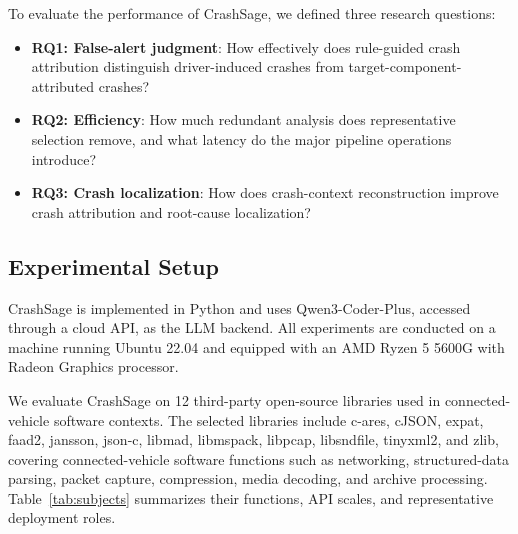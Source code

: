 \documentclass[pdflatex,sn-basic]{sn-jnl}%
\theoremstyle{thmstyleone}%
\theoremstyle{thmstyletwo}%
\theoremstyle{thmstylethree}%
\begin{document}
To evaluate the performance of CrashSage, we defined three research questions:

\begin{itemize}
    \item \textbf{RQ1: False-alert judgment}: How effectively does rule-guided crash attribution distinguish driver-induced crashes from target-component-attributed crashes?
    \item \textbf{RQ2: Efficiency}: How much redundant analysis does representative selection remove, and what latency do the major pipeline operations introduce?
    \item \textbf{RQ3: Crash localization}: How does crash-context reconstruction improve crash attribution and root-cause localization?
\end{itemize}

\subsection{Experimental Setup}

CrashSage is implemented in Python and uses Qwen3-Coder-Plus, accessed through a cloud API, as the LLM backend. All experiments are conducted on a machine running Ubuntu 22.04 and equipped with an AMD Ryzen 5 5600G with Radeon Graphics processor.

We evaluate CrashSage on 12 third-party open-source libraries used in connected-vehicle software contexts. The selected libraries include c-ares, cJSON, expat, faad2, jansson, json-c, libmad, libmspack, libpcap, libsndfile, tinyxml2, and zlib, covering connected-vehicle software functions such as networking, structured-data parsing, packet capture, compression, media decoding, and archive processing. Table~\ref{tab:subjects} summarizes their functions, API scales, and representative deployment roles.
\end{document}
